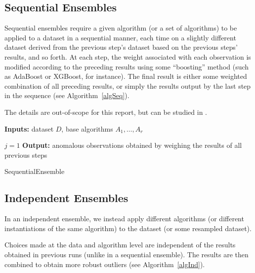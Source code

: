 \subsection*{Sequential Ensembles}
Sequential ensembles require a given algorithm (or a set of algorithms) to be applied to a dataset in a sequential manner, each time on a slightly different dataset derived from the previous step's dataset based on the previous steps' results, and so forth. At each step, the weight associated with each observation is modified according to the preceding results using some ``boosting'' method (such as AdaBoost or XGBoost, for instance). \newl The final result is either some weighted combination of all preceding results, or simply the results output by the last step in the sequence (see Algorithm~\ref{algSeq}). 

The details are out-of-scope for this report, but can be studied in \cite{LB}.

\begin{algorithm}
\SetAlgoLined
\textbf{Inputs:} dataset $D$, base algorithms $A_1,\ldots,A_r$ 

$j=1$\;
\textbf{Output:} anomalous observations obtained by weighing the results of all previous steps 
\caption{SequentialEnsemble}\label{algSeq}
\end{algorithm}%
\subsection*{Independent Ensembles}
In an independent ensemble, we instead apply different algorithms (or different instantiations of the same algorithm) to the dataset (or some resampled dataset). \par Choices made at the data and algorithm level
are independent of the results obtained in previous runs (unlike in a sequential ensemble). The results are then combined to obtain more robust outliers (see Algorithm~\ref{algInd}).

